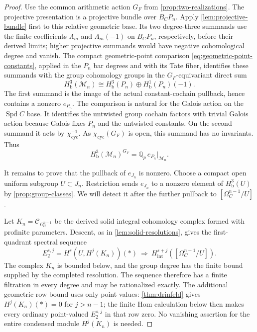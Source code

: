 \documentclass[11pt]{article}
\numberwithin{equation}{section}
\theoremstyle{definition}
\theoremstyle{remark}
\newcommand{\Q}{\mathbb Q}
\DeclareMathOperator{\Spd}{Spd}
\begin{document}
\begin{proof}
Use the common arithmetic action $G_F$ from
\cref{prop:two-realizations}.
The projective presentation is a projective bundle over $B_CP_n$.
Apply \cref{lem:projective-bundle} first to this relative geometric
base.  Its two degree-three summands use the finite coefficients
$\Lambda_m$ and $\Lambda_m(-1)$ on $B_CP_n$, respectively, before
their derived limits; higher projective summands would have negative
cohomological degree and vanish.  The compact geometric-point comparison
\eqref{eq:geometric-point-constants}, applied in the $P_n$ bar degrees
and with its Tate fiber, identifies these summands with the group
cohomology groups in the $G_F$-equivariant direct sum
\begin{equation}\label{eq:projective-degree-three}
 H^3_{\mathrm b}(\mathcal M_n)
 \cong H^3_{\mathrm b}(P_n)
          \oplus H^1_{\mathrm b}(P_n)(-1).
\end{equation}
The first summand is the image of the actual constant-cochain pullback,
hence contains a nonzero $e_{P_n}$.  The comparison is natural for the
Galois action on the $\Spd C$ base.  It identifies the untwisted group
cochain factors with trivial Galois action because Galois fixes $P_n$
and the untwisted constants.
On the second summand it acts by $\chi_{\mathrm{cyc}}^{-1}$.
As $\chi_{\mathrm{cyc}}(G_F)$ is open, this summand has no invariants.
Thus
\begin{equation}\label{eq:invariant-line}
 H^3_{\mathrm b}(\mathcal M_n)^{G_F}
       =\Q_p\,e_{P_n}|_{\mathcal M_n}.
\end{equation}

It remains to prove that the pullback of $e_{J_n}$ is nonzero.
Choose a compact open uniform subgroup $U\subset J_n$.
Restriction sends $e_{J_n}$ to a nonzero element of
$H^3_{\mathrm b}(U)$ by \cref{prop:group-classes}.
We will detect it after the further pullback to $[\Omega_C^{n-1}/U]$.

Let $K_n=\mathscr C_{\Omega_C^{n-1}}$ be the derived solid integral
cohomology complex formed with profinite parameters.
Descent, as in \cref{lem:solid-resolutions}, gives the first-quadrant
spectral sequence
\begin{equation}\label{eq:drinfeld-descent}
 E_2^{s,j}=H^s(U,H^j(K_n))(*)
 \ \Longrightarrow\
 H_{\mathrm{int}}^{s+j}([\Omega_C^{n-1}/U]).
\end{equation}
The complex $K_n$ is bounded below, and the group degree has the finite
bound supplied by the completed resolution.  The sequence therefore
has a finite filtration in every degree and may be rationalized
exactly.  The additional geometric row bound uses only point values:
\cref{thm:drinfeld} gives $H^j(K_n)(*)=0$ for $j>n-1$;
the finite Hom calculation below then makes every ordinary
point-valued $E_2^{s,j}$ in that row zero.  No vanishing assertion for
the entire condensed module $H^j(K_n)$ is needed.


\end{proof}
\end{document}
